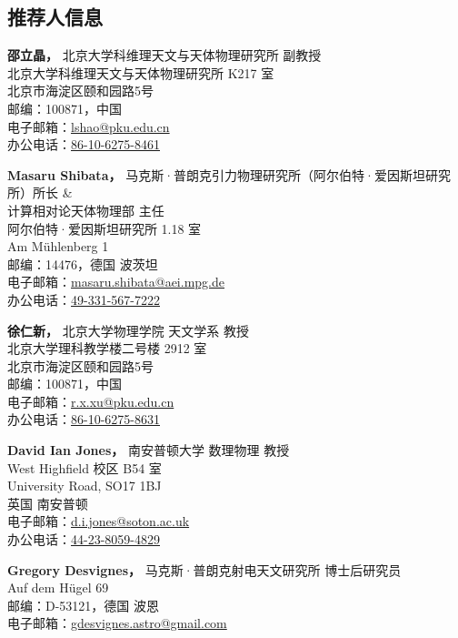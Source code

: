 \documentclass[margin,line]{res_mod}
\begin{document}
\begin{resume}
\section{推荐人信息}
\vspace*{.05in}
\parbox{\textwidth}{%
{\bf 邵立晶，} 北京大学科维理天文与天体物理研究所 副教授 \\
北京大学科维理天文与天体物理研究所 K217 室 \\
北京市海淀区颐和园路5号 \\
邮编：100871，中国 \\
电子邮箱：\href{mailto:lshao@pku.edu.cn}{lshao@pku.edu.cn} \\
办公电话：\href{tel: 86-10-6275-8461}{86-10-6275-8461}}
\par
\parbox{\textwidth}{%
{\bf Masaru Shibata，} 马克斯·普朗克引力物理研究所（阿尔伯特·爱因斯坦研究所）所长 \&\\
计算相对论天体物理部 主任 \\
阿尔伯特·爱因斯坦研究所 1.18 室 \\
Am Mühlenberg 1 \\
邮编：14476，德国 波茨坦 \\
电子邮箱：\href{mailto:masaru.shibata@aei.mpg.de}{masaru.shibata@aei.mpg.de} \\
办公电话：\href{tel:49-331-567-7222}{49-331-567-7222}}
\par
\parbox{\textwidth}{%
{\bf 徐仁新，} 北京大学物理学院 天文学系 教授 \\
北京大学理科教学楼二号楼 2912 室 \\
北京市海淀区颐和园路5号 \\
邮编：100871，中国 \\
电子邮箱：\href{mailto:r.x.xu@pku.edu.cn}{r.x.xu@pku.edu.cn} \\
办公电话：\href{tel:86-10-6275-8631}{86-10-6275-8631}}
\par
\parbox{\textwidth}{%
{\bf David Ian Jones，} 南安普顿大学 数理物理 教授 \\
West Highfield 校区 B54 室 \\
University Road, SO17 1BJ \\
英国 南安普顿 \\
电子邮箱：\href{mailto:d.i.jones@soton.ac.uk}{d.i.jones@soton.ac.uk} \\
办公电话：\href{tel:44-23-8059-4829}{44-23-8059-4829}}
\par
\parbox{\textwidth}{%
{\bf Gregory Desvignes，} 马克斯·普朗克射电天文研究所 博士后研究员 \\
Auf dem Hügel 69 \\
邮编：D-53121，德国 波恩 \\
电子邮箱：\href{mailto:gdesvignes.astro@gmail.com}{gdesvignes.astro@gmail.com}}

\end{resume}
\end{document}
